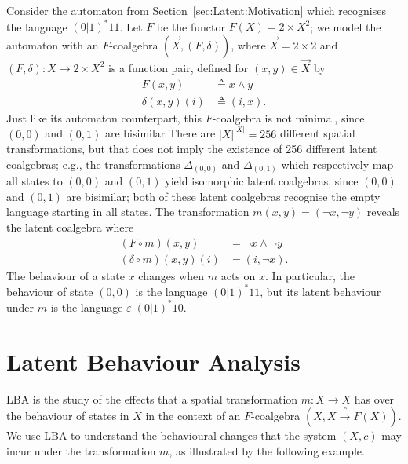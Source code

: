 \begin{example}
\label{ex:Latent:TheExample}
Consider the automaton from Section~\ref{sec:Latent:Motivation} which recognises the language $(0|1)^*11$. Let $F$ be the functor $F(X)=2\times X^2$; we model the automaton with an $F$-coalgebra $(\vec{X},(F,\delta))$, where $\vec{X}=2\times2$ and $(F,\delta)\colon X\rightarrow 2\times X^2$ is a function pair, defined for $(x,y)\in \vec{X}$ by
\begin{align}
    F(x,y)&\triangleq x \land y\\
    \delta(x,y)(i)&\triangleq (i,x).
\end{align}
Just like its automaton counterpart, this $F$-coalgebra is not minimal, since $(0,0)$ and $(0,1)$ are bisimilar
There are $|X|^{|X|}=256$ different spatial transformations, but that does not imply the existence of 256 different latent coalgebras; e.g., the transformations $\Delta_{(0,0)}$ and $\Delta_{(0,1)}$ which respectively map all states to $(0,0)$ and $(0,1)$ yield isomorphic latent coalgebras, since $(0,0)$ and $(0,1)$ are bisimilar; both of these latent coalgebras recognise the empty language starting in all states. 
The transformation $m(x,y)=(\lnot x,\lnot y)$ reveals the latent coalgebra where 
\begin{align}
    (F\circ m)(x,y)&= \lnot x \land \lnot y\\
    (\delta\circ m)(x,y)(i)&= (i,\lnot x).
\end{align}
The behaviour of a state $x$ changes when $m$ acts on $x$. In particular, the behaviour of state $(0,0)$ is the language $(0|1)^*11$, but its latent behaviour under $m$ is the language $\varepsilon|(0|1)^*10$.
\end{example}
\section{Latent Behaviour Analysis}
LBA is the study of the effects that a spatial transformation $m\colon X\rightarrow X$ has over the behaviour of states in $X$ in the context of an $F$-coalgebra $(X,X\xrightarrow{c} F(X))$. We use LBA to understand the behavioural changes that the system $(X,c)$ may incur under the transformation $m$, as illustrated by the following example.

